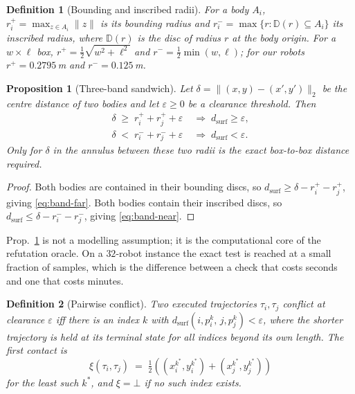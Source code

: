 \documentclass[conference]{IEEEtran}
\newtheorem{definition}{Definition}
\newtheorem{proposition}{Proposition}
\newcommand{\clr}{\varepsilon}
\begin{document}
\begin{definition}[Bounding and inscribed radii]
For a body $A_i$, $r^{+}_i = \max_{z \in A_i}\lVert z\rVert$ is its \emph{bounding radius}
and $r^{-}_i = \max\{r : \mathbb{D}(r) \subseteq A_i\}$ its \emph{inscribed radius}, where
$\mathbb{D}(r)$ is the disc of radius $r$ at the body origin. For a $w \times \ell$ box,
$r^{+} = \tfrac12\sqrt{w^2+\ell^2}$ and $r^{-} = \tfrac12\min(w,\ell)$; for our robots
$r^{+} = 0.2795$\,m and $r^{-} = 0.125$\,m.
\end{definition}

\begin{proposition}[Three-band sandwich]
\label{prop:bands}
Let $\delta = \lVert (x,y) - (x',y') \rVert_2$ be the centre distance of two bodies and let
$\clr \ge 0$ be a clearance threshold. Then
\begin{align}
  \delta \;\ge\; r^{+}_i + r^{+}_j + \clr
    &\;\Longrightarrow\; d_{\text{surf}} \ge \clr, \label{eq:band-far}\\
  \delta \;<\; r^{-}_i + r^{-}_j + \clr
    &\;\Longrightarrow\; d_{\text{surf}} < \clr. \label{eq:band-near}
\end{align}
Only for $\delta$ in the annulus between these two radii is the exact box-to-box distance
required.
\end{proposition}

\begin{proof}
Both bodies are contained in their bounding discs, so $d_{\text{surf}} \ge \delta - r^{+}_i
- r^{+}_j$, giving \eqref{eq:band-far}. Both bodies contain their inscribed discs, so
$d_{\text{surf}} \le \delta - r^{-}_i - r^{-}_j$, giving \eqref{eq:band-near}.
\end{proof}

Prop.~\ref{prop:bands} is not a modelling assumption; it is the computational core of the
refutation oracle. On a $32$-robot instance the exact test is reached at a small fraction
of samples, which is the difference between a check that costs seconds and one that costs
minutes.

\begin{definition}[Pairwise conflict]
\label{def:conflict}
Two executed trajectories $\tau_i,\tau_j$ \emph{conflict at clearance $\clr$} iff there is
an index $k$ with $d_{\text{surf}}(i,p_i^k,\,j,p_j^k) < \clr$, where the shorter trajectory
is held at its terminal state for all indices beyond its own length. The \emph{first
contact} is
\begin{equation}
  \xi(\tau_i,\tau_j) \;=\; \tfrac12\!\left( (x_i^{k^\ast},y_i^{k^\ast}) +
                                            (x_j^{k^\ast},y_j^{k^\ast}) \right)
  \label{eq:xi}
\end{equation}
for the least such $k^\ast$, and $\xi = \bot$ if no such index exists.
\end{definition}
\end{document}
